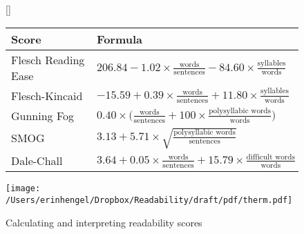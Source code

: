 \begin{figure}
	[\FBwidth]
	{
		\caption{Calculating and interpreting readability scores}\label{figure2X}
	}
	{
	\begin{minipage}{0.7\textwidth}
		\small
		\begin{tabular}{ll}
			Score&Formula\\
			\midrule
			Flesch Reading Ease&$206.84-1.02\times\frac{\text{words}}{\text{sentences}}-84.60\times\frac{\text{syllables}}{\text{words}}$\\
			Flesch-Kincaid&$-15.59+0.39\times\frac{\text{words}}{\text{sentences}}+11.80\times\frac{\text{syllables}}{\text{words}}$\\
			Gunning Fog&$0.40\times\big(\frac{\text{words}}{\text{sentences}}+100\times\frac{\text{polysyllabic words}}{\text{words}}\big)$\\
			SMOG&$3.13+5.71\times\sqrt{\frac{\text{polysyllabic words}}{\text{sentences}}}$\\
			Dale-Chall&$3.64+0.05\times\frac{\text{words}}{\text{sentences}}+15.79\times\frac{\text{difficult words}}{\text{words}}$\\
		\end{tabular}
	\end{minipage}
	\begin{minipage}{0.25\textwidth}
		\texttt{[image: /Users/erinhengel/Dropbox/Readability/draft/pdf/therm.pdf]}
	\end{minipage}
	}
\end{figure}